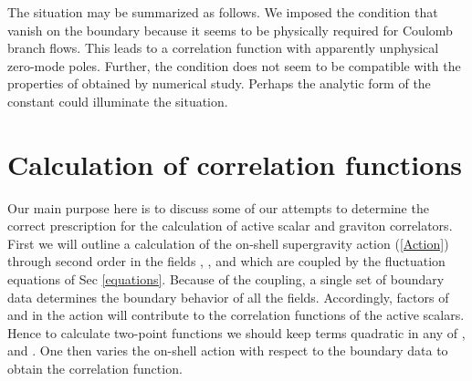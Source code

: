 \documentclass[a4paper,12pt]{article}
\def\varphit{\tilde{\varphi}}
\begin{document}
The situation may be summarized as follows. We imposed the condition
that \coordHE{} vanish on the boundary because it seems to be physically
required for Coulomb branch flows. This leads to a correlation function
with apparently unphysical zero-mode poles. Further, the condition
\coordHE{} does not seem to be compatible with the properties of \coordHE{}
obtained by numerical study. Perhaps the analytic form of the constant
\myHighlight{$\varphit(a)$}\coordHE{} could illuminate the situation.  




\section{Calculation of correlation functions}
\label{2point}

Our main purpose here is to discuss some of our attempts to determine
the correct prescription for the calculation of active scalar and
graviton correlators. First we will outline a calculation of the
on-shell supergravity action (\ref{Action}) through second order in
the fields \myHighlight{$\varphit$}\coordHE{}, \coordHE{}, and \coordHE{} which are coupled by the
fluctuation equations of Sec \ref{equations}. Because of the coupling,
a single set of boundary data determines the boundary behavior of all
the fields.  Accordingly, factors of \coordHE{} and \coordHE{} in the action will
contribute to the correlation functions of the active scalars. Hence
to calculate two-point functions we should keep terms quadratic in any
of \myHighlight{$\varphit$}\coordHE{}, \coordHE{} and \coordHE{}.  One then varies the on-shell action with
respect to the boundary data to obtain the correlation function.
\end{document}
